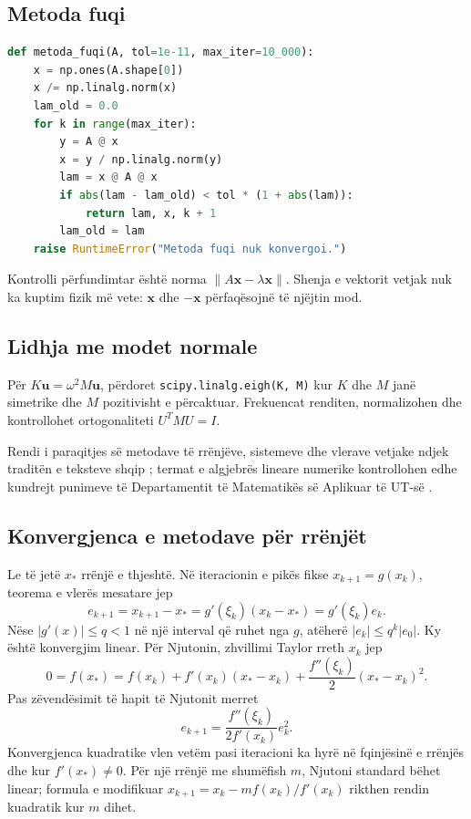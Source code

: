 \documentclass[11pt,oneside,openany]{book}
\newcommand{\vect}[1]{\bm{#1}}
\begin{document}
\subsection{Metoda fuqi}
\begin{lstlisting}[language=Python,caption={Vlera vetjake dominante dhe kuocienti Rayleigh.}]
def metoda_fuqi(A, tol=1e-11, max_iter=10_000):
    x = np.ones(A.shape[0])
    x /= np.linalg.norm(x)
    lam_old = 0.0
    for k in range(max_iter):
        y = A @ x
        x = y / np.linalg.norm(y)
        lam = x @ A @ x
        if abs(lam - lam_old) < tol * (1 + abs(lam)):
            return lam, x, k + 1
        lam_old = lam
    raise RuntimeError("Metoda fuqi nuk konvergoi.")
\end{lstlisting}
Kontrolli përfundimtar është norma $\|A\vect x-\lambda\vect x\|$. Shenja e vektorit vetjak nuk ka kuptim fizik më vete: $\vect x$ dhe $-\vect x$ përfaqësojnë të njëjtin mod.

\subsection{Lidhja me modet normale}
Për $K\vect u=\omega^2M\vect u$, përdoret \texttt{scipy.linalg.eigh(K, M)} kur $K$ dhe $M$ janë simetrike dhe $M$ pozitivisht e përcaktuar. Frekuencat renditen, normalizohen dhe kontrollohet ortogonaliteti $U^TMU=I$.

Rendi i paraqitjes së metodave të rrënjëve, sistemeve dhe vlerave vetjake ndjek traditën e teksteve shqip \cite{hanelli,hoxha,datja}; termat e algjebrës lineare numerike kontrollohen edhe kundrejt punimeve të Departamentit të Matematikës së Aplikuar të UT-së \cite{zeqiri2020}.



\subsection{Konvergjenca e metodave për rrënjët}
Le të jetë $x_*$ rrënjë e thjeshtë. Në iteracionin e pikës fikse $x_{k+1}=g(x_k)$, teorema e vlerës mesatare jep
\begin{equation}
 e_{k+1}=x_{k+1}-x_*=g'(\xi_k)(x_k-x_*)=g'(\xi_k)e_k.
\end{equation}
Nëse $|g'(x)|\le q<1$ në një interval që ruhet nga $g$, atëherë $|e_k|\le q^k|e_0|$. Ky është konvergjim linear. Për Njutonin, zhvillimi Taylor rreth $x_k$ jep
\begin{equation}
 0=f(x_*)=f(x_k)+f'(x_k)(x_*-x_k)+\frac{f''(\xi_k)}{2}(x_*-x_k)^2.
\end{equation}
Pas zëvendësimit të hapit të Njutonit merret
\begin{equation}
 e_{k+1}=\frac{f''(\xi_k)}{2f'(x_k)}e_k^2.
\end{equation}
Konvergjenca kuadratike vlen vetëm pasi iteracioni ka hyrë në fqinjësinë e rrënjës dhe kur $f'(x_*)\ne0$. Për një rrënjë me shumëfish $m$, Njutoni standard bëhet linear; formula e modifikuar $x_{k+1}=x_k-mf(x_k)/f'(x_k)$ rikthen rendin kuadratik kur $m$ dihet.
\end{document}
